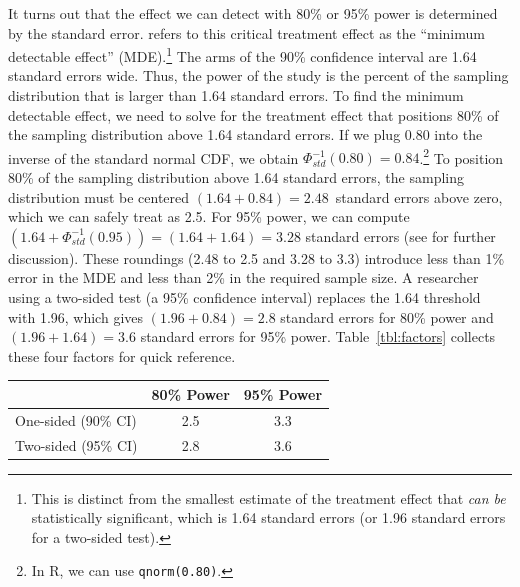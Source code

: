 \documentclass[12pt]{article}
\let\origtable\table
\let\endorigtable\endtable
\renewenvironment{table}[1][]{\origtable[htbp]}{\endorigtable}
\newcommand{\headrow}{}
\begin{document}
It turns out that the effect we can detect with 80\% or 95\% power is determined by the standard error.
\citet{Bloom1995} refers to this critical treatment effect as the ``minimum detectable effect'' (MDE).\footnote{
  This is distinct from the smallest estimate of the treatment effect that \textit{can be} statistically significant, which is 1.64 standard errors (or 1.96 standard errors for a two-sided test).
}
The arms of the 90\% confidence interval are 1.64 standard errors wide.
Thus, the power of the study is the percent of the sampling distribution that is larger than 1.64 standard errors.
To find the minimum detectable effect, we need to solve for the treatment effect that positions 80\% of the sampling distribution above 1.64 standard errors.
If we plug 0.80 into the inverse of the standard normal CDF, we obtain $\Phi_{std}^{-1}(0.80) = 0.84$.\footnote{
  In R, we can use \texttt{qnorm(0.80)}.
  }
To position 80\% of the sampling distribution above 1.64 standard errors, the sampling distribution must be centered $(1.64 + 0.84) = 2.48$~standard errors above zero, which we can safely treat as 2.5. For 95\% power, we can compute $(1.64 + \Phi_{std}^{-1}(0.95)) = (1.64 + 1.64) = 3.28$ standard errors (see \citealt{Bloom1995} for further discussion).
These roundings (2.48 to 2.5 and 3.28 to 3.3) introduce less than 1\% error in the MDE and less than 2\% in the required sample size.
A researcher using a two-sided test (a 95\% confidence interval) replaces the 1.64 threshold with 1.96, which gives $(1.96 + 0.84) = 2.8$ standard errors for 80\% power and $(1.96 + 1.64) = 3.6$ standard errors for 95\% power.
Table~\ref{tbl:factors} collects these four factors for quick reference.

\begin{table}[h]
\centering
\caption{This table shows the minimum detectable effect, in standard errors, for the default one-sided test (a 90\% confidence interval) and for the two-sided test that some researchers prefer (a 95\% confidence interval), each at 80\% and 95\% power. These four factors appear throughout the rules. Tables~3 and~4 give the corresponding values for other power levels.}\label{tbl:factors}
\renewcommand{\arraystretch}{1.3}
\begin{tabular}{lcc}
\toprule
\headrow & \textbf{80\% Power} & \textbf{95\% Power} \\
\midrule
One-sided (90\% CI) & 2.5 & 3.3 \\
Two-sided (95\% CI) & 2.8 & 3.6 \\
\bottomrule
\end{tabular}
\end{table}
\end{document}
